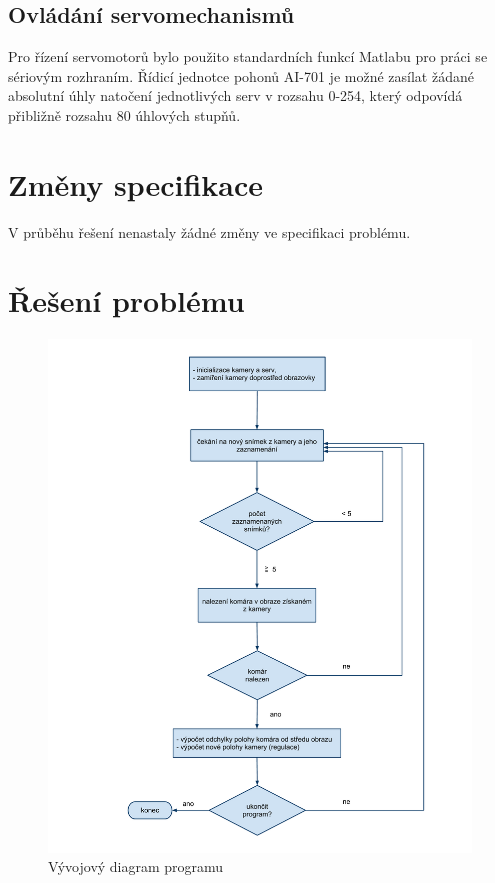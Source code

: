 \documentclass[a4paper,10pt]{article}
\begin{document}
	\subsection{Ovládání servomechanismů}

		Pro řízení servomotorů bylo použito standardních funkcí Matlabu pro práci se sériovým rozhraním.
		Řídicí jednotce pohonů AI-701 je možné zasílat žádané absolutní úhly natočení jednotlivých serv
		v rozsahu 0-254, který odpovídá přibližně rozsahu 80 úhlových stupňů.

\section{Změny specifikace}

		V průběhu řešení nenastaly žádné změny ve specifikaci problému.
		
\section{Řešení problému}

		\begin{figure}[!h]
			\centering
			 \includegraphics[width=1\columnwidth]{pics/vyvojovy_diagram_programu}
			 \caption{Vývojový diagram programu}\label{fig:Diagram_programu}
		\end{figure}
\end{document}
